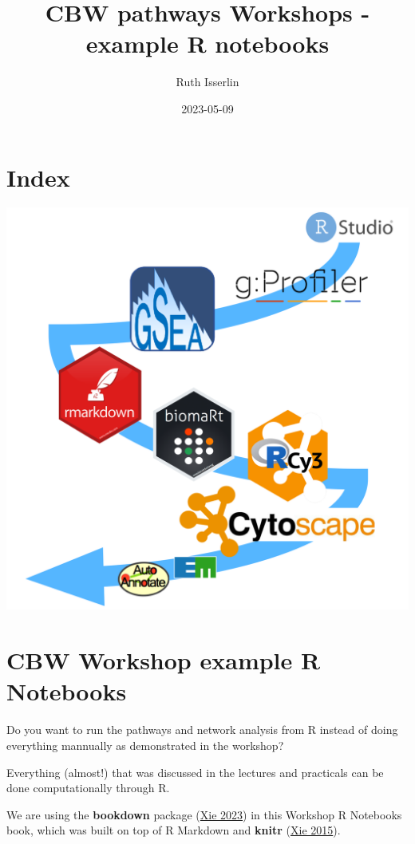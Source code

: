 \documentclass[
]{book}
\title{CBW pathways Workshops - example R notebooks}
\author{Ruth Isserlin}
\date{2023-05-09}
\begin{document}
\maketitle

{
\setcounter{tocdepth}{1}
\tableofcontents
}
\hypertarget{index}{%
\chapter{Index}\label{index}}

\includegraphics{./images/cover.png}

\hypertarget{intro}{%
\chapter{CBW Workshop example R Notebooks}\label{intro}}

Do you want to run the pathways and network analysis from R instead of doing everything mannually as demonstrated in the workshop?

Everything (almost!) that was discussed in the lectures and practicals can be done computationally through R.

We are using the \textbf{bookdown} package (\protect\hyperlink{ref-R-bookdown}{Xie 2023}) in this Workshop R Notebooks book, which was built on top of R Markdown and \textbf{knitr} (\protect\hyperlink{ref-xie2015}{Xie 2015}).
\end{document}
